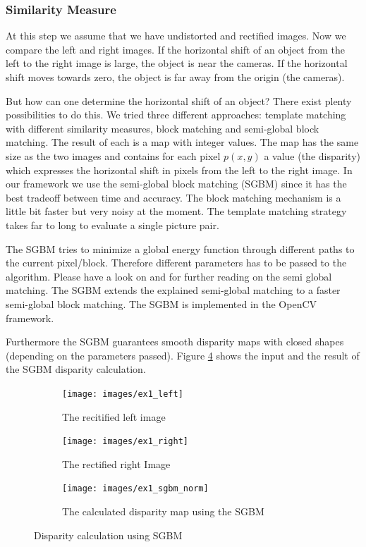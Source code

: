 \documentclass[11pt]{article}
\begin{document}
\subsubsection{Similarity Measure}
At this step we assume that we have undistorted and rectified images. Now we compare the left and right images. If the horizontal shift of an object from the left to the right image is large, the object is near the cameras. If the horizontal shift moves towards zero, the object is far away from the origin (the cameras).

But how can one determine the horizontal shift of an object? There exist plenty possibilities to do this. We tried three different approaches: template matching with different similarity measures, block matching and semi-global block matching. The result of each is a map with integer values. The map has the same size as the two images and contains for each pixel $p(x,y)$ a value (the disparity) which expresses the horizontal shift in pixels from the left to the right image. In our framework we use the semi-global block matching (SGBM) since it has the best tradeoff between time and accuracy. The block matching mechanism is a little bit faster but very noisy at the moment. The template matching strategy takes far to long to evaluate a single picture pair. 

The SGBM tries to minimize a global energy function through different paths to the current pixel/block. Therefore different parameters has to be passed to the algorithm. Please have a look on \cite{hirschmuller2005accurate} and \cite{hirschmuller2008stereo} for further reading on the semi global matching. The SGBM extends the explained semi-global matching to a faster semi-global block matching. The SGBM is implemented in the OpenCV framework.

Furthermore the SGBM guarantees smooth disparity maps with closed shapes (depending on the parameters passed). Figure \ref{fig:ex1_sgbm} shows the input and the result of the SGBM disparity calculation.

\begin{figure}[H]
        \centering
        \begin{subfigure}[b]{0.45\textwidth}
                \texttt{[image: images/ex1\_left]}
                \caption{The recitified left image}
                \label{fig:ex1_left}
        \end{subfigure}\hfill  
        \begin{subfigure}[b]{0.45\textwidth}
                \texttt{[image: images/ex1\_right]}
                \caption{The rectified right Image}
                \label{fig:ex1_right}
        \end{subfigure}

        \begin{subfigure}[b]{\textwidth}
                \texttt{[image: images/ex1\_sgbm\_norm]}
                \caption{The calculated disparity map using the SGBM}
                \label{fig:ex1_sgbm_norm}
        \end{subfigure}
        \caption{Disparity calculation using SGBM}\label{fig:ex1_sgbm}
\end{figure}
\end{document}
